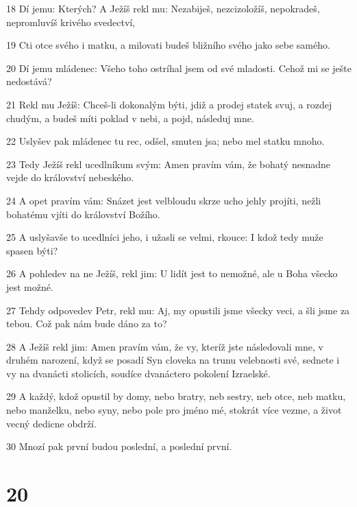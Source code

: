 \par 18 Dí jemu: Kterých? A Ježíš rekl mu: Nezabiješ, nezcizoložíš, nepokradeš, nepromluvíš krivého svedectví,
\par 19 Cti otce svého i matku, a milovati budeš bližního svého jako sebe samého.
\par 20 Dí jemu mládenec: Všeho toho ostríhal jsem od své mladosti. Cehož mi se ješte nedostává?
\par 21 Rekl mu Ježíš: Chceš-li dokonalým býti, jdiž a prodej statek svuj, a rozdej chudým, a budeš míti poklad v nebi, a pojd, následuj mne.
\par 22 Uslyšev pak mládenec tu rec, odšel, smuten jsa; nebo mel statku mnoho.
\par 23 Tedy Ježíš rekl ucedlníkum svým: Amen pravím vám, že bohatý nesnadne vejde do království nebeského.
\par 24 A opet pravím vám: Snázet jest velbloudu skrze ucho jehly projíti, nežli bohatému vjíti do království Božího.
\par 25 A uslyšavše to ucedlníci jeho, i užasli se velmi, rkouce: I kdož tedy muže spasen býti?
\par 26 A pohledev na ne Ježíš, rekl jim: U lidít jest to nemožné, ale u Boha všecko jest možné.
\par 27 Tehdy odpovedev Petr, rekl mu: Aj, my opustili jsme všecky veci, a šli jsme za tebou. Což pak nám bude dáno za to?
\par 28 A Ježíš rekl jim: Amen pravím vám, že vy, kteríž jste následovali mne, v druhém narození, když se posadí Syn cloveka na trunu velebnosti své, sednete i vy na dvanácti stolicích, soudíce dvanáctero pokolení Izraelské.
\par 29 A každý, kdož opustil by domy, nebo bratry, neb sestry, neb otce, neb matku, nebo manželku, nebo syny, nebo pole pro jméno mé, stokrát více vezme, a život vecný dedicne obdrží.
\par 30 Mnozí pak první budou poslední, a poslední první.

\chapter{20}

